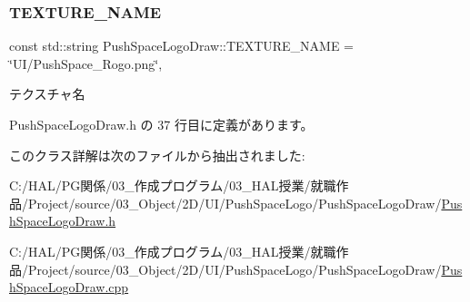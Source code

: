 \subsubsection{\texorpdfstring{T\+E\+X\+T\+U\+R\+E\+\_\+\+N\+A\+ME}{TEXTURE\_NAME}}
{\footnotesize\ttfamily const std\+::string Push\+Space\+Logo\+Draw\+::\+T\+E\+X\+T\+U\+R\+E\+\_\+\+N\+A\+ME = \char`\"{}UI/Push\+Space\+\_\+\+Rogo.\+png\char`\"{}\hspace{0.3cm}{\ttfamily [static]}, {\ttfamily [private]}}



テクスチャ名 



 Push\+Space\+Logo\+Draw.\+h の 37 行目に定義があります。



このクラス詳解は次のファイルから抽出されました\+:\begin{DoxyCompactItemize}
\item 
C\+:/\+H\+A\+L/\+P\+G関係/03\+\_\+作成プログラム/03\+\_\+\+H\+A\+L授業/就職作品/\+Project/source/03\+\_\+\+Object/2\+D/\+U\+I/\+Push\+Space\+Logo/\+Push\+Space\+Logo\+Draw/\mbox{\hyperlink{_push_space_logo_draw_8h}{Push\+Space\+Logo\+Draw.\+h}}\item 
C\+:/\+H\+A\+L/\+P\+G関係/03\+\_\+作成プログラム/03\+\_\+\+H\+A\+L授業/就職作品/\+Project/source/03\+\_\+\+Object/2\+D/\+U\+I/\+Push\+Space\+Logo/\+Push\+Space\+Logo\+Draw/\mbox{\hyperlink{_push_space_logo_draw_8cpp}{Push\+Space\+Logo\+Draw.\+cpp}}\end{DoxyCompactItemize}
